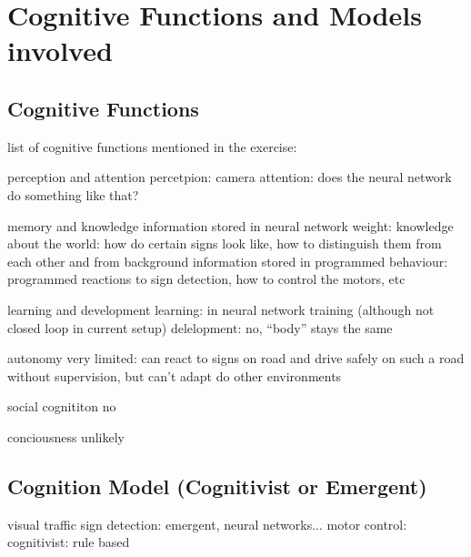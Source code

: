 
\section{Cognitive Functions and Models involved}

\subsection{Cognitive Functions}
list of cognitive functions mentioned in the exercise:

perception and attention
percetpion: camera
attention: does the neural network do something like that?

memory and knowledge
information stored in neural network weight: knowledge about the world: how do certain signs look like, how to distinguish them from each other and from background
information stored in programmed behaviour: programmed reactions to sign detection, how to control the motors, etc

learning and development
learning: in neural network training (although not closed loop in current setup)
delelopment: no, ``body'' stays the same

autonomy
very limited: can react to signs on road and drive safely on such a road without supervision, but can't adapt do other environments

social cognititon
no

conciousness
unlikely

\subsection{Cognition Model (Cognitivist or Emergent)}
visual traffic sign detection: emergent, neural networks...
motor control: cognitivist: rule based


\cite{abbrev}







